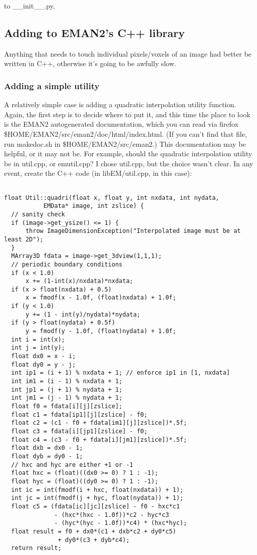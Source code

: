  to \_\_init\_\_.py.
\subsection{Adding to EMAN2's C++ library}


 Anything that needs to touch individual pixels/voxels of an image had better be written in C++, otherwise it's going to be awfully slow.
\subsubsection{Adding a simple utility}


 A relatively simple case is adding a quadratic interpolation utility function. Again, the first step is to decide where to put it, and this time the place to look is the EMAN2 autogenerated documentation, which you can read via firefox \$HOME/EMAN2/src/eman2/doc/html/index.html. (If you can't find that file, run makedoc.sh in \$HOME/EMAN2/src/eman2.) This documentation may be helpful, or it may not be. For example, should the quadratic interpolation utility be in util.cpp, or emutil.cpp? I chose util.cpp, but the choice wasn't clear. In any event, create the C++ code (in libEM/util.cpp, in this case):
\begin{verbatim}

float Util::quadri(float x, float y, int nxdata, int nydata, 
           EMData* image, int zslice) {
  // sanity check
  if (image->get_ysize() <= 1) {
      throw ImageDimensionException("Interpolated image must be at least 2D");
  }
  MArray3D fdata = image->get_3dview(1,1,1);
  // periodic boundary conditions
  if (x < 1.0) 
      x += (1-int(x)/nxdata)*nxdata;
  if (x > float(nxdata) + 0.5)
      x = fmodf(x - 1.0f, (float)nxdata) + 1.0f;
  if (y < 1.0)
      y += (1 - int(y)/nydata)*nydata;
  if (y > float(nydata) + 0.5f)
      y = fmodf(y - 1.0f, (float)nydata) + 1.0f;
  int i = int(x);
  int j = int(y);
  float dx0 = x - i;
  float dy0 = y - j;
  int ip1 = (i + 1) % nxdata + 1; // enforce ip1 in [1, nxdata]
  int im1 = (i - 1) % nxdata + 1;
  int jp1 = (j + 1) % nydata + 1;
  int jm1 = (j - 1) % nydata + 1;
  float f0 = fdata[i][j][zslice];
  float c1 = fdata[ip1][j][zslice] - f0;
  float c2 = (c1 - f0 + fdata[im1][j][zslice])*.5f;
  float c3 = fdata[i][jp1][zslice] - f0;
  float c4 = (c3 - f0 + fdata[i][jm1][zslice])*.5f;
  float dxb = dx0 - 1;
  float dyb = dy0 - 1;
  // hxc and hyc are either +1 or -1
  float hxc = (float)((dx0 >= 0) ? 1 : -1);
  float hyc = (float)((dy0 >= 0) ? 1 : -1);
  int ic = int(fmodf(i + hxc, float(nxdata)) + 1);
  int jc = int(fmodf(j + hyc, float(nydata)) + 1);
  float c5 = (fdata[ic][jc][zslice] - f0 - hxc*c1
              - (hxc*(hxc - 1.0f))*c2 - hyc*c3
              - (hyc*(hyc - 1.0f))*c4) * (hxc*hyc);
  float result = f0 + dx0*(c1 + dxb*c2 + dy0*c5)
               + dy0*(c3 + dyb*c4);
  return result;

\end{verbatim}


